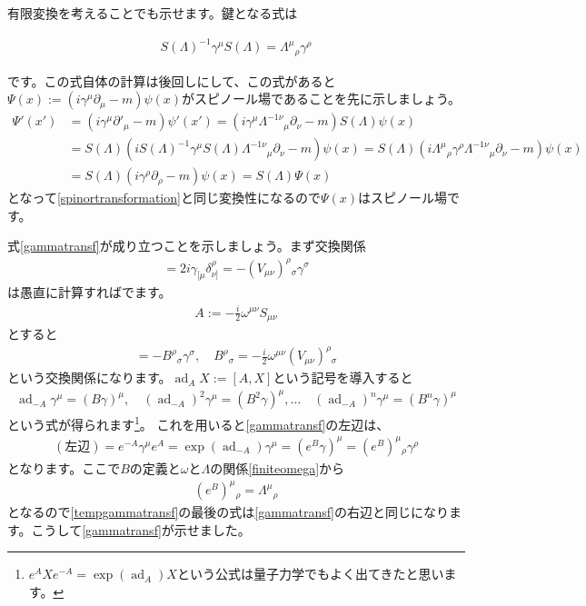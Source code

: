 \documentclass[report,paper=a4, fontsize=12pt, line_length=16cm, number_of_lines=33,dvipdfmx]{jlreq}
\newenvironment{important}{\begin{tcolorbox}[
  colback = white,
  colframe = red!35,
  boxrule = 2mm,
  fonttitle = \bfseries,
  after = \noindent] }{\end{tcolorbox}}
\numberwithin{equation}{chapter}
\newcommand{\del}{\partial}
\DeclareMathOperator{\ad}{\mathrm{ad}}
\begin{document}
有限変換を考えることでも示せます。鍵となる式は
\begin{important}
\begin{align}
  S(\Lambda)^{-1}\gamma^{\mu}S(\Lambda)=\Lambda^{\mu}{}_{\rho}
  \gamma^{\rho}
  \label{gammatransf}
\end{align}
\end{important}
です。この式自体の計算は後回しにして、この式があると$\Psi(x):=(i\gamma^{\mu}\del_{\mu}-m)\psi(x)$がスピノール場であることを先に示しましょう。
\begin{align}
  \Psi'(x')
  &=(i\gamma^{\mu}\del'_{\mu}-m)\psi'(x')
  =(i\gamma^{\mu}\Lambda^{-1\nu}{}_{\mu}\del_{\nu}-m)S(\Lambda)\psi(x)\nonumber\\
  &=S(\Lambda)(iS(\Lambda)^{-1}\gamma^{\mu}S(\Lambda)\Lambda^{-1\nu}{}_{\mu}\del_{\nu}-m)\psi(x)
  =S(\Lambda)(i\Lambda^{\mu}{}_{\rho}\gamma^{\rho}\Lambda^{-1\nu}{}_{\mu}\del_{\nu}-m)\psi(x)\nonumber\\
  &=S(\Lambda)(i\gamma^{\rho}\del_{\rho}-m)\psi(x)
  =S(\Lambda)\Psi(x)
\end{align}
となって\eqref{spinortransformation}と同じ変換性になるので$\Psi(x)$はスピノール場です。

式\eqref{gammatransf}が成り立つことを示しましょう。まず交換関係
\begin{align}
  [S_{\mu\nu},\gamma^{\rho}]=2i\gamma_{[\mu}\delta^{\rho}_{\nu]}=-(V_{\mu\nu})^{\rho}{}_{\sigma}\gamma^{\sigma}
\end{align}
は愚直に計算すればでます。
\begin{align}
  A:=-\frac{i}{2}\omega^{\mu\nu}S_{\mu\nu}
\end{align}
とすると
\begin{align}
  [A,\gamma^{\rho}]=-B^{\rho}{}_{\sigma}\gamma^{\sigma},\quad
  B^{\rho}{}_{\sigma}=-\frac{i}{2}\omega^{\mu\nu}(V_{\mu\nu})^{\rho}{}_{\sigma}
\end{align}
という交換関係になります。$\ad_{A}X:=[A,X]$という記号を導入すると
\begin{align}
  \ad_{-A}\gamma^{\mu}=(B\gamma)^{\mu},\quad
  (\ad_{-A})^2\gamma^{\mu}=(B^2\gamma)^{\mu},\dots\quad
  (\ad_{-A})^{n}\gamma^{\mu}=(B^n\gamma)^{\mu}
\end{align}
という式が得られます\footnote{$e^{A}Xe^{-A}=\exp(\ad_A)X$という公式は量子力学でもよく出てきたと思います。}。
これを用いると\eqref{gammatransf}の左辺は、
\begin{align}
  (\text{左辺})=e^{-A}\gamma^{\mu}e^{A}
  =\exp(\ad_{-A})\gamma^{\mu}
  =(e^{B}\gamma)^{\mu}
  =(e^{B})^{\mu}{}_{\rho}\gamma^{\rho}\label{tempgammatransf}
\end{align}
となります。ここで$B$の定義と$\omega$と$\Lambda$の関係\eqref{finiteomega}から
\begin{align}
  (e^{B})^{\mu}{}_{\rho}=\Lambda^{\mu}{}_{\rho}
\end{align}
となるので\eqref{tempgammatransf}の最後の式は\eqref{gammatransf}の右辺と同じになります。こうして\eqref{gammatransf}が示せました。
\end{document}
